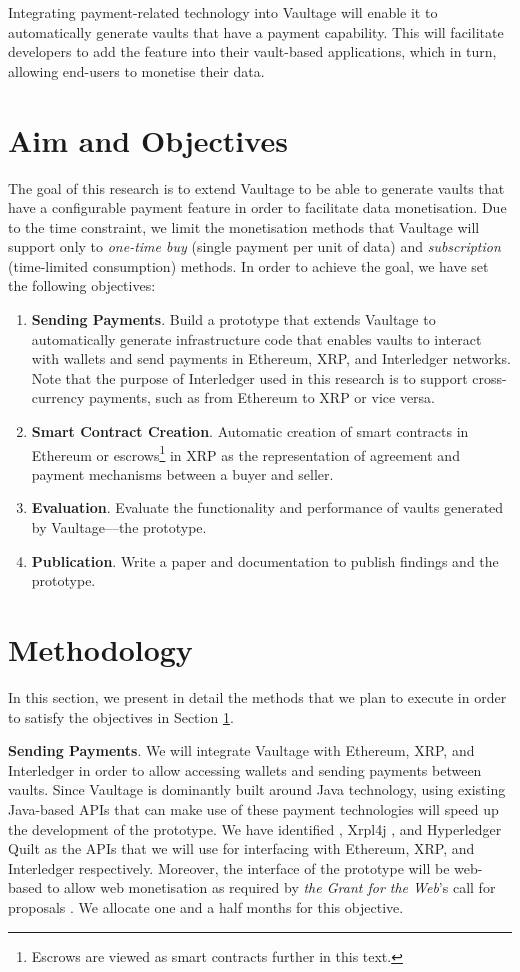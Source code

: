 \documentclass[]{article}
\begin{document}
	Integrating payment-related technology into Vaultage will enable it to automatically generate vaults that have a payment capability. This will facilitate developers to add the feature into their vault-based applications, which in turn, allowing end-users to monetise their data.   
	
	\section{Aim and Objectives}
	\label{sec:aim_and_objectives}
	The goal of this research is to extend Vaultage to be able to generate vaults that have a configurable payment feature in order to facilitate data monetisation. Due to the time constraint, we limit the monetisation methods that Vaultage will support only to \emph{one-time buy} (single payment per unit of data) and \emph{subscription} (time-limited consumption) methods. In order to achieve the goal, we have set the following objectives:
	\begin{enumerate}
		\item \textbf{Sending Payments}. Build a prototype that extends Vaultage to automatically generate infrastructure code that enables vaults to interact with wallets and send payments in Ethereum, XRP, and Interledger networks. Note that the purpose of Interledger used in this research is to support cross-currency payments, such as from Ethereum to XRP or vice versa.
		\item \textbf{Smart Contract Creation}. Automatic creation of smart contracts in Ethereum or escrows\footnote{Escrows are viewed as smart contracts further in this text.} \cite{xrpl-escrow} in XRP as the representation of agreement and payment mechanisms between a buyer and seller. 
		\item \textbf{Evaluation}. Evaluate the functionality and performance of vaults generated by Vaultage---the prototype. 
		\item \textbf{Publication}. Write a paper and documentation to publish findings and the prototype.
	\end{enumerate}  
	
	\section{Methodology}
	\label{Methodology}
	In this section, we present in detail the methods that we plan to execute in order to satisfy the objectives in Section \ref{sec:aim_and_objectives}. 
	
	\textbf{Sending Payments}. 
	We will integrate Vaultage with Ethereum, XRP, and Interledger in order to allow accessing wallets and sending payments between vaults. Since Vaultage is dominantly built around Java technology, using existing Java-based APIs that can make use of these payment technologies will speed up the development of the prototype. We have identified \cite{web3j}, Xrpl4j \cite{xrpl4j}, and Hyperledger Quilt \cite{quilt} as the APIs that we will use for interfacing with Ethereum, XRP, and Interledger respectively. Moreover, the interface of the prototype will be web-based to allow web monetisation as required by \emph{the Grant for the Web}'s call for proposals \cite{grant-for-the-web}. We allocate one and a half months for this objective. 
	
\end{document}
